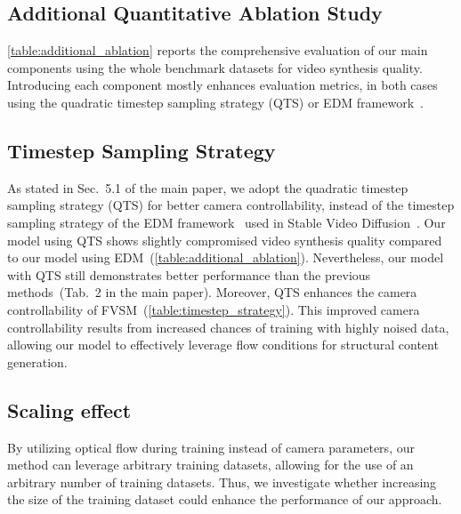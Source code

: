 \subsection{Additional Quantitative Ablation Study}
\cref{table:additional_ablation} reports the comprehensive evaluation of our main components using the whole benchmark datasets for video synthesis quality.
Introducing each component mostly enhances evaluation metrics, in both cases using the quadratic timestep sampling strategy (QTS) or EDM framework~\cite{karras2022elucidating}.

\subsection{Timestep Sampling Strategy}
As stated in Sec.~5.1 of the main paper, we adopt the quadratic timestep sampling strategy (QTS) for better camera controllability, instead of the timestep sampling strategy of the EDM framework~\cite{karras2022elucidating} used in Stable Video Diffusion~\cite{blattmann2023stable}.
Our model using QTS shows slightly compromised video synthesis quality compared to our model using EDM~(\cref{table:additional_ablation}).
Nevertheless, our model with QTS still demonstrates better performance than the previous methods~(Tab.~2 in the main paper).
Moreover, QTS enhances the camera controllability of FVSM~(\cref{table:timestep_strategy}).
This improved camera controllability results from increased chances of training with highly noised data, allowing our model to effectively leverage flow conditions for structural content generation.


\begin{table}[!t]
\centering
{}
\vspace{-3mm}
\caption{
Analysis of the scaling effect using the Pexels-large benchmark dataset and the FVD scores.
}
\vspace{-4mm}
\label{table:scaling_effect}
\end{table}


\subsection{Scaling effect}
By utilizing optical flow during training instead of camera parameters, our method can leverage arbitrary training datasets, allowing for the use of an arbitrary number of training datasets.
Thus, we investigate whether increasing the size of the training dataset could enhance the performance of our approach.

